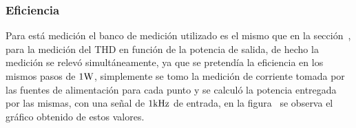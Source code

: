 \begin{table}[H]  %
    
    \setlength\arrayrulewidth{1.5pt}
    \def\clinecolor{\hhline{|>{\arrayrulecolor{white}}-%
    >{\arrayrulecolor{white}}|-|-|}}
    
\begin{center}  
    \caption{Temperatura del disipador a máxima potencia de salida ($ T_{amb} = 27 \si[per-mode=symbol]{\degree\celsius} $).}
    \label{tab:comp_term}
	\end{center}
\end{table}


\vfill

\clearpage


\subsubsection{Eficiencia}

Para está medición el banco de medición utilizado es el mismo que en la sección~, para la medición del THD en función de la potencia de salida, de hecho la medición se relevó simultáneamente, ya que se pretendía la eficiencia en los mismos pasos de $ 1 \si[per-mode=symbol]{\watt} $, simplemente se tomo la medición de corriente tomada por las fuentes de alimentación para cada punto y se calculó la potencia entregada por las mismas, con una señal de $ 1 \si[per-mode=symbol]{\kilo\hertz} $ de entrada, en la figura~ se observa el gráfico obtenido de estos valores.\\


